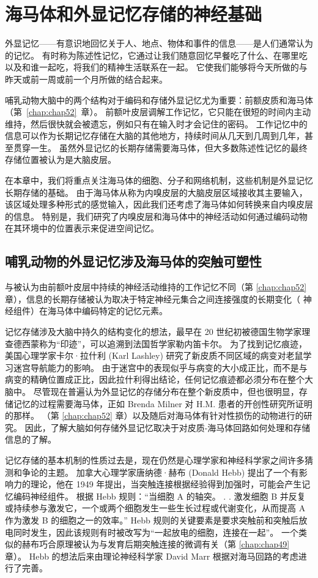 \chapter{海马体和外显记忆存储的神经基础} \label{chap:chap54}

外显记忆——有意识地回忆关于人、地点、物体和事件的信息——是人们通常认为的记忆。
有时称为陈述性记忆，它通过让我们随意回忆早餐吃了什么、在哪里吃以及和谁一起吃，将我们的精神生活联系在一起。
它使我们能够将今天所做的与昨天或前一周或前一个月所做的结合起来。


哺乳动物大脑中的两个结构对于编码和存储外显记忆尤为重要：前额皮质和海马体（第~\ref{chap:chap52}~章）。
前额叶皮层调解工作记忆，它只能在很短的时间内主动维持，然后很快就会被遗忘，例如只有在输入时才会记住的密码。
工作记忆中的信息可以作为长期记忆存储在大脑的其他地方，持续时间从几天到几周到几年，甚至贯穿一生。
虽然外显记忆的长期存储需要海马体，但大多数陈述性记忆的最终存储位置被认为是大脑皮层。


在本章中，我们将重点关注海马体的细胞、分子和网络机制，这些机制是外显记忆长期存储的基础。
由于海马体从称为内嗅皮层的大脑皮层区域接收其主要输入，该区域处理多种形式的感觉输入，因此我们还考虑了海马体如何转换来自内嗅皮层的信息。
特别是，我们研究了内嗅皮层和海马体中的神经活动如何通过编码动物在其环境中的位置表示来促进空间记忆。



\section{哺乳动物的外显记忆涉及海马体的突触可塑性}

与被认为由前额叶皮层中持续的神经活动维持的工作记忆不同（第 \ref{chap:chap52} 章），信息的长期存储被认为取决于特定神经元集合之间连接强度的长期变化（ 神经组件）在海马体中编码特定的记忆元素。


记忆存储涉及大脑中持久的结构变化的想法，最早在 20 世纪初被德国生物学家理查德西蒙称为“印迹”，可以追溯到法国哲学家勒内笛卡尔。
为了找到记忆痕迹，美国心理学家卡尔·拉什利 (Karl Lashley) 研究了新皮质不同区域的病变对老鼠学习迷宫导航能力的影响。
由于迷宫中的表现似乎与病变的大小成正比，而不是与病变的精确位置成正比，因此拉什利得出结论，任何记忆痕迹都必须分布在整个大脑中。
尽管现在普遍认为外显记忆的存储分布在整个新皮质中，但也很明显，存储记忆的过程需要海马体，正如 Brenda Milner 对 H.M. 患者的开创性研究所证明的那样。
（第 \ref{chap:chap52} 章）以及随后对海马体有针对性损伤的动物进行的研究。
因此，了解大脑如何存储外显记忆取决于对皮质-海马体回路如何处理和存储信息的了解。


记忆存储的基本机制的性质过去是，现在仍然是心理学家和神经科学家之间许多猜测和争论的主题。
加拿大心理学家唐纳德·赫布 (Donald Hebb) 提出了一个有影响力的理论，他在 1949 年提出，当突触连接根据经验得到加强时，可能会产生记忆编码神经组件。 根据 Hebb 规则：“当细胞 A 的轴突。 . . 激发细胞 B 并反复或持续参与激发它，一个或两个细胞发生一些生长过程或代谢变化，从而提高 A 作为激发 B 的细胞之一的效率。” 
Hebb 规则的关键要素是要求突触前和突触后放电同时发生，因此该规则有时被改写为“一起放电的细胞，连接在一起”。
一个类似的赫布巧合原理被认为与发育后期突触连接的微调有关（第 \ref{chap:chap49} 章）。
Hebb 的想法后来由理论神经科学家 David Marr 根据对海马回路的考虑进行了完善。


